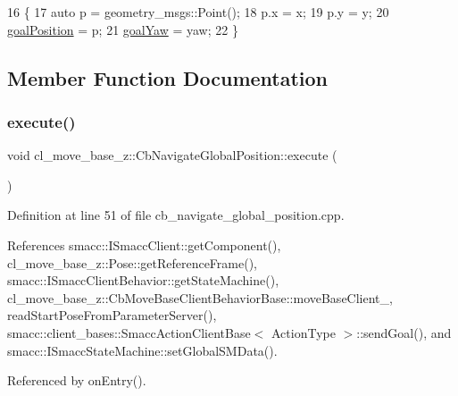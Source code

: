 \begin{DoxyCode}
16     \{
17         \textcolor{keyword}{auto} p = geometry\_msgs::Point();
18         p.x = x;
19         p.y = y;
20         \hyperlink{classcl__move__base__z_1_1CbNavigateGlobalPosition_a51a0266fd9a63e99f26e88933529c559}{goalPosition} = p;
21         \hyperlink{classcl__move__base__z_1_1CbNavigateGlobalPosition_a839900de7f664b27c9be189fadbaa003}{goalYaw} = yaw;
22     \}
\end{DoxyCode}


\subsection{Member Function Documentation}
\mbox{\label{classcl__move__base__z_1_1CbNavigateGlobalPosition_a0b8525ea9e4388b27cb1f9b1e06a3b63}} 
\subsubsection{\texorpdfstring{execute()}{execute()}}
{\footnotesize\ttfamily void cl\+\_\+move\+\_\+base\+\_\+z\+::\+Cb\+Navigate\+Global\+Position\+::execute (\begin{DoxyParamCaption}{ }\end{DoxyParamCaption})}



Definition at line 51 of file cb\+\_\+navigate\+\_\+global\+\_\+position.\+cpp.



References smacc\+::\+I\+Smacc\+Client\+::get\+Component(), cl\+\_\+move\+\_\+base\+\_\+z\+::\+Pose\+::get\+Reference\+Frame(), smacc\+::\+I\+Smacc\+Client\+Behavior\+::get\+State\+Machine(), cl\+\_\+move\+\_\+base\+\_\+z\+::\+Cb\+Move\+Base\+Client\+Behavior\+Base\+::move\+Base\+Client\+\_\+, read\+Start\+Pose\+From\+Parameter\+Server(), smacc\+::client\+\_\+bases\+::\+Smacc\+Action\+Client\+Base$<$ Action\+Type $>$\+::send\+Goal(), and smacc\+::\+I\+Smacc\+State\+Machine\+::set\+Global\+S\+M\+Data().



Referenced by on\+Entry().


